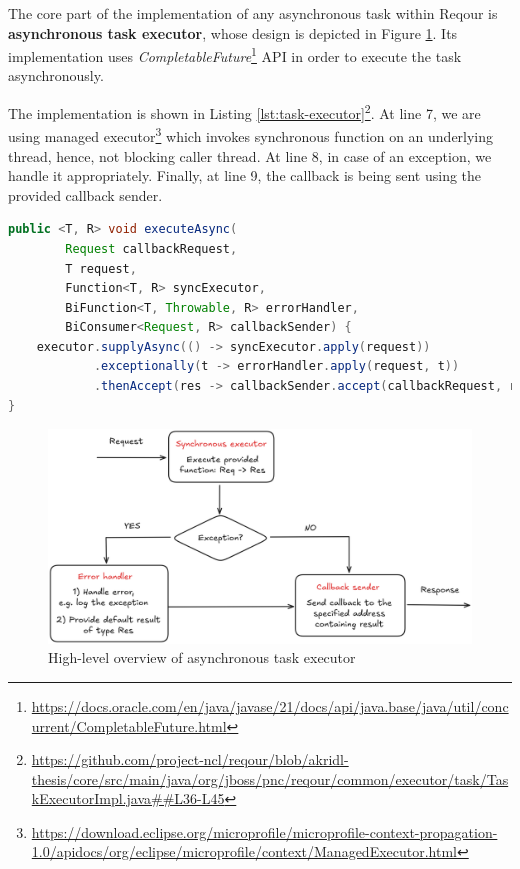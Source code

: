 \documentclass[../main.tex]{subfiles}
\begin{document}
The core part of the implementation of any asynchronous task within Reqour is \textbf{asynchronous task executor}, whose design is depicted in Figure \ref{fig:task-executor}. Its implementation uses \textit{CompletableFuture}\footnote{\url{https://docs.oracle.com/en/java/javase/21/docs/api/java.base/java/util/concurrent/CompletableFuture.html}} API in order to execute the task asynchronously.

The implementation is shown in Listing \ref{lst:task-executor}\footnote{\url{https://github.com/project-ncl/reqour/blob/akridl-thesis/core/src/main/java/org/jboss/pnc/reqour/common/executor/task/TaskExecutorImpl.java##L36-L45}}. At line 7, we are using managed executor\footnote{\url{https://download.eclipse.org/microprofile/microprofile-context-propagation-1.0/apidocs/org/eclipse/microprofile/context/ManagedExecutor.html}} which invokes synchronous function on an underlying thread, hence, not blocking caller thread. At line 8, in case of an exception, we handle it appropriately. Finally, at line 9, the callback is being sent using the provided callback sender.

\begin{lstlisting}[language=Java, caption=Asynchronous task executor, label={lst:task-executor}]
public <T, R> void executeAsync(
        Request callbackRequest,
        T request,
        Function<T, R> syncExecutor,
        BiFunction<T, Throwable, R> errorHandler,
        BiConsumer<Request, R> callbackSender) {
    executor.supplyAsync(() -> syncExecutor.apply(request))
            .exceptionally(t -> errorHandler.apply(request, t))
            .thenAccept(res -> callbackSender.accept(callbackRequest, res));
}
\end{lstlisting}

\begin{figure}
  \begin{center}
    \includegraphics[width=\textwidth]{images/task-executor.png}
  \end{center}
  \caption{High-level overview of asynchronous task executor}
  \label{fig:task-executor}
\end{figure}
\end{document}
